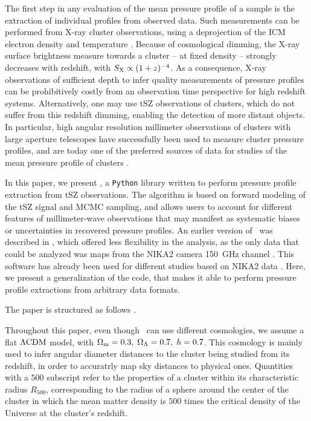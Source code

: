 The first step in any evaluation of the mean pressure profile of a sample is the extraction of individual profiles from observed data.
Such measurements can be performed from X-ray cluster observations, using a deprojection of the ICM electron density and temperature \citep[see \eg][for reviews]{bohringer_x-ray_2010, bohringer_x-ray_2013}.
Because of cosmological dimming, the X-ray surface brightness measure towards a cluster -- at fixed density -- strongly decreases with redshift, with $S_{\rm X} \propto (1+z)^{-4}$.
As a consequence, X-ray observations of sufficient depth to infer quality measurements of pressure profiles can be prohibitively costly from an observation time perspective for high redshift systems.
Alternatively, one may use tSZ observations of clusters, which do not suffer from this redshift dimming, enabling the detection of more distant objects.
In particular, high angular resolution millimeter observations of clusters with large aperture telescopes have successfully been used to measure cluster pressure profiles, and are today one of the preferred sources of data for studies of the mean pressure profile of clusters \citep[\eg][]{mayet_cluster_2020, young_mean_2022, sayers_evolution_2022}.

In this paper, we present \panco, a \texttt{Python} library written to perform pressure profile extraction from tSZ observations.
The algorithm is based on forward modeling of the tSZ signal and MCMC sampling, and allows users to account for different features of millimeter-wave observations that may manifest as systematic biases or uncertainties in recovered pressure profiles.
An earlier version of \panco\ was described in \citet{keruzore_panco2_2021}, which offered less flexibility in the analysis, as the only data that could be analyzed was maps from the NIKA2 camera 150~GHz channel \citep{adam_nika2_2018, perotto_calibration_2020}.
This software has already been used for different studies based on NIKA2 data \citep[\eg][]{artis_psz2_2022,munoz-echeverria_multi-probe_2022,munoz-echeverria_lpsz-clash_2022}.
Here, we present a generalization of the code, that makes it able to perform pressure profile extractions from arbitrary data formats.

The paper is structured as follows \todo.
\textcolor{lightgray}{\lipsum[6]}

Throughout this paper, even though \panco\ can use different cosmologies, we assume a flat $\Lambda {\rm CDM}$ model, with $\Omega_{\rm m} = 0.3, \;\Omega_\Lambda = 0.7, \; h = 0.7$.
This cosmology is mainly used to infer angular diameter distances to the cluster being studied from its redshift, in order to accuratrly map sky distances to physical ones.
Quantities with a $500$ subscript refer to the properties of a cluster within its characteristic radius $R_{500}$, corresponding to the radius of a sphere around the center of the cluster in which the mean matter density is $500$ times the critical density of the Universe at the cluster's redshift.
